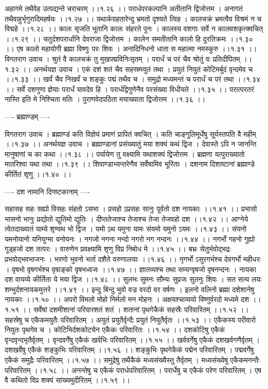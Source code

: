 \documentclass[11pt]{book}
\begin{document}
\begin{landscape}
अहागमे तथैवेह उत्पद्यन्ते चराचरम् ।।१.२६ ।।
परार्धपरकल्पानि अतीतानि द्विजोत्तम ।
अनागतं तथैवाहुर्भृगुरादिमहर्षयः ।।१.२७ ।।
यथार्कग्रहतारेन्दु भ्रमतो दृश्यते त्विह ।
कालचक्रं भ्रमत्वैव विश्रमं न च विद्महे ।।१.२८ ।।
कालः सृजति भूतानि कालः संहरते पुनः ।
कालस्य वशगाः सर्वे न कालवशकृत्क्वचित् ।।१.२९ ।।
चतुर्दशपरार्धानि देवराजा द्विजोत्तम ।
कालेन समतीतानि कालो हि दुरतिक्रमः ।।१.३० ।।
एष कालो महायोगी ब्रह्मा विष्णुः परः शिवः ।
अनादिनिधनो धाता स महात्मा नमस्कुरु ।।१.३१ ।।
विगतराग उवाच ।
श्रुतं वै कालचक्रं तु मुखपद्मविनिःसृतम् ।
परार्धं च परं चैव श्रोतुं वः प्रतिदीपितम् ।।१.३२ ।।
अनर्थयज्ञ उवाच ।
एकं दशं शतं चैव सहस्रमयुतं तथा ।
प्रयुतं नियुतं कोटिमर्बुदं वृन्दमेव च ।।१.३३ ।।
खर्वं चैव निखर्वं च शङ्कुः पद्मं तथैव च ।
समुद्रो मध्यमन्तं च परार्धं च परं तथा ।।१.३४ ।।
सर्वे दशगुणा ज्ञेयाः परार्धं यावदेव हि ।
परार्धद्विगुणेनैव परसंख्या विधीयते ।।१.३५ ।।
परात्परतरं नास्ति इति मे निश्चिता मतिः ।
पुराणवेदपठिता मयाख्याता द्विजोत्तम ।।१.३६ ।।

---- ब्रह्माण्डम् ----

विगतराग उवाच ।
ब्रह्माण्डं कति विज्ञेयं प्रमाणं प्रापितं क्वचित् ।
कति चाङ्गुलिमूर्धेषु सूर्यस्तपति वै महीम् ।।१.३७ ।।
अनर्थयज्ञ उवाच ।
ब्रह्माण्डानां प्रसंख्यातुं मया शक्यं कथं द्विज ।
देवास्ते ऽपि न जानन्ति मानुषाणां च का कथा ।।१.३८ ।।
पर्यायेण तु वक्ष्यामि यथाशक्यं द्विजोत्तम ।
ब्रह्मणा यत्पुराख्यातो मातरिश्वा यथा तथा ।।१.३९ ।।
शिवाण्डाभ्यन्तरेणैव सर्वेषामिव भूरिताः ।
दशनाम दिशाष्टानां ब्रह्माण्डे कीर्तितं शृणु ।।१.४० ।।

---- दश नामानि दिगष्टकानाम् ----

सहासह सहः सह्यो विसहः संहतो ऽसभा ।
प्रसहो ऽप्रसहः सानुः पूर्वतो दश नायकाः ।।१.४१ ।।
प्रभासो भासनो भानुः प्रद्योतो द्युतिमो द्युतिः ।
दीप्ततेजाश्च तेजाश्च तेजा तेजवहो दश ।।१.४२ ।।
आग्नेये त्वेतदाख्यातं याम्ये शृण्वथ भो द्विज ।
यमो ऽथ यमुना यामः संयमो यमुनो ऽयमः ।।१.४३ ।।
संयनो यमनोयानो यनियुग्मा यनोयनः ।
नगजो नगना नन्दो नगरो नग नन्दनः ।।१.४४ ।।
नगर्भो गहनो गुह्यो गूड्हजो दश तत्परः ।
वारुणेन प्रवक्ष्यामि शृणु विप्र निबोध मे ।।१.४५ ।।
बभ्रः सेतुर्भवोद्भद्रः प्रभवोद्भवभाजनः ।
भरणो भुवनो भर्ता दशैते वरुणालयाः ।।१.४६ ।।
नृगर्भो ऽसुरगर्भश्च देवगर्भो महीधरः ।
वृषभो वृषगर्भश्च वृषाङ्को वृषभध्वजः ।।१.४७ ।।
ज्ञातव्यश्च तथा सम्यग्वृषजो वृषनन्दनः ।
नायका दश वायव्ये कीर्तिता ये मया द्विज ।।१.४८ ।।
सुलभः सुमनः सौम्यः सुप्रजः सुतनुः शिवः ।
सत सत्य लयः शम्भुर्दशनायकमुत्तरे ।।१.४९ ।।
इन्दु बिन्दु भुवो वज्र वरदो वर वर्षणः ।
इलनो वलिनो ब्रह्मा दशेशानेषु नायकाः ।।१.५० ।।
अपरो विमलो मोहो निर्मलो मन मोहनः ।
अक्षयश्चाव्ययो विष्णुर्वरदो मध्यमे दश ।।१.५१ ।।
सर्वेषां दशमीशानां परिवारशतं शतं ।
शतानां पृथगेकैकं सहस्रैः परिवारितम् ।।१.५२ ।।
सहस्रेषु च एकैकमयुतैः परिवारितम् ।
अयुतं प्रयुतैर्वृन्दैः प्रयुतं नियुतैर्वृतः ।।१.५३ ।।
एकैकस्य परीवारो नियुतः पृथगेव च ।
कोटिभिर्दशकोट्येन एकैकः परिवारितः ।।१.५४ ।।
दशकोटिषु एकैकं वृन्दवृन्दभृतैर्वृतम् ।
वृन्दवर्गेषु एकैकं खर्वभिः परिवारितम् ।।१.५५ ।।
खर्ववर्गेषु एकैकं दशखर्वगणैर्वृतम् ।
दशखर्वेषु एकैकं शङ्कुभिः परिवारितम् ।।१.५६ ।।
शङ्कुभिः पृथगेकैकं पद्मेन परिवारितम् ।
पद्मवर्गेषु एकैकं समुद्रैः परिवारितम् ।।१.५७ ।।
समुद्रेषु तथैकैकं मध्यसंख्यैस्तु तैर्वृतम् ।
मध्यसंख्येषु एकैकमनन्तैः परिवारितम् ।।१.५८ ।।
अनन्तेषु च एकैकं परार्धपरिवारितम् ।
परार्धेषु च एकैकं परेण परिवारितम् ।
एष वै कथितो विप्र शक्यं सांख्यमुदीरितम् ।।१.५९ ।।


\end{landscape}
\end{document}
